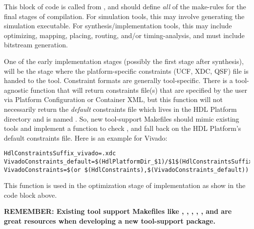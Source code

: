 \setlength{\leftskip}{0pt}

This  block of code is called from , and should define \textit{all} of the make-rules for the final stages of compilation. For simulation tools, this may involve generating the simulation executable. For synthesis/implementation tools, this may include optimizing, mapping, placing, routing, and/or timing-analysis, and must include bitstream generation. \newline

One of the early implementation stages (possibly the first stage after synthesis), will be the stage where the platform-specific constraints (UCF, XDC, QSF) file is handed to the tool. Constraint formats are generally tool-specific. There is a tool-agnostic function  that will return constraints file(s) that are specified by the user via Platform Configuration or Container XML, but this function will not necessarily return the \textit{default} constraints file which lives in the HDL Platform directory and is named . So, new tool-support Makefiles should mimic existing tools and implement a function to check , and fall back on the HDL Platform's default constraints file. Here is an example for Vivado:
\begin{lstlisting}[showspaces=false]
HdlConstraintsSuffix_vivado=.xdc
VivadoConstraints_default=$(HdlPlatformDir_$1)/$1$(HdlConstraintsSuffix_vivado)
VivadoConstraints=$(or $(HdlConstraints),$(VivadoConstraints_default))
\end{lstlisting}
This  function is used in the optimization stage of implementation as show in the  code block above.\newline\bigskip

\textbf{REMEMBER: Existing tool support Makefiles like , , , , ,  and  are great resources when developing a new tool-support package.}



